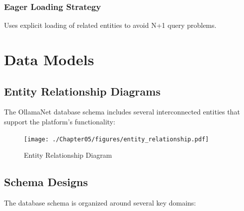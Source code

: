\subsubsection*{Eager Loading Strategy}

Uses explicit loading of related entities to avoid N+1 query problems.

\section{Data Models}

\subsection{Entity Relationship Diagrams}

The OllamaNet database schema includes several interconnected entities that support the platform's functionality:

\begin{figure}
    \centering
    \texttt{[image: ./Chapter05/figures/entity\_relationship.pdf]}
    \caption{Entity Relationship Diagram}
    \label{fig:entity-relationship}
\end{figure}
\clearpage

\subsection{Schema Designs}

The database schema is organized around several key domains:

